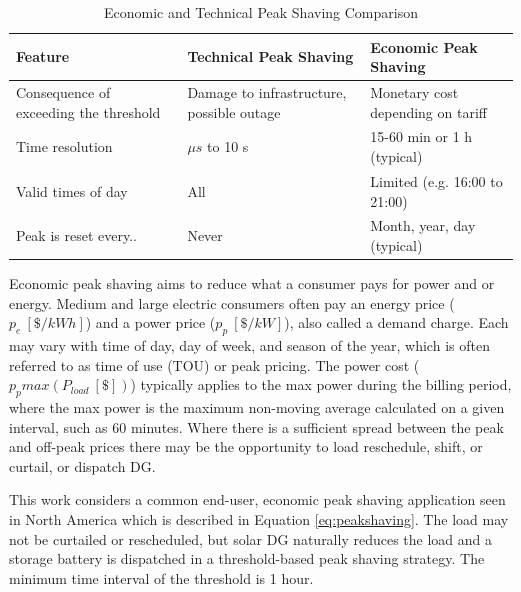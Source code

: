\documentclass[journal,article,submit,pdftex,moreauthors]{Definitions/mdpi}
\begin{document}
\begin{table}
  \centering
  \caption{Economic and Technical Peak Shaving Comparison}
  \label{tab:econ-tech-peak-shaving}
  \begin{tabularx}{\textwidth}{XXX}
    \toprule
    Feature                                & Technical Peak Shaving                   & Economic Peak Shaving             \\
    \midrule
    Consequence of exceeding the threshold & Damage to infrastructure, possible outage & Monetary cost depending on tariff \\
    Time resolution                     & $\mu s$ to 10 s                                & 15-60 min or 1 h (typical)    \\
    Valid times of day                     & All                                      & Limited (e.g. 16:00 to 21:00)     \\
    Peak is reset every..                  & Never                                    & Month, year, day (typical)        \\
    \bottomrule
  \end{tabularx}
\end{table}


Economic peak shaving aims to reduce what a consumer pays for power and or energy. Medium and large electric consumers often pay an energy price ($p_e\ [\$/kWh]$) and a power price ($p_p\ [\$/kW]$), also called a demand charge. Each may vary with time of day, day of week, and season of the year, which is often referred to as time of use (TOU) or peak pricing. The power cost ($p_p max(P_{load}\ [\$])$) typically applies to the max power during the billing period, where the max power is the maximum non-moving average calculated on a given interval, such as 60 minutes. Where there is a sufficient spread between the peak and off-peak prices there may be the opportunity to load reschedule, shift, or curtail, or dispatch DG.

This work considers a common end-user, economic peak shaving application seen in North America which is described in Equation \ref{eq:peakshaving}. The load may not be curtailed or rescheduled, but solar DG naturally reduces the load and a storage battery is dispatched in a threshold-based peak shaving strategy. The minimum time interval of the threshold is 1 hour.
\end{document}
